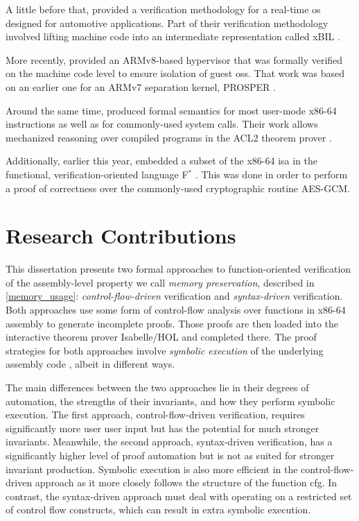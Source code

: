A little before that, \textcite{shi2012orientais} provided a verification methodology
for a real-time \ac{os} designed for automotive applications.
Part of their verification methodology involved lifting machine code into an intermediate
representation called xBIL \autocite{shi2012xbil}.

More recently, \textcite{baumann2016high} provided an ARMv8-based hypervisor
that was formally verified on the machine code level
to ensure isolation of guest \acp{os}.
That work was based on an earlier one for an ARMv7 separation kernel,
PROSPER \autocite{dam2013hypervisor,dam2013formal}.

Around the same time, \textcite{goel2014syscalls,goelphd} produced formal semantics
for most user-mode x86-64 instructions as well as for commonly-used system calls.
Their work allows mechanized reasoning over compiled programs
in the ACL2 theorem prover \autocite{ACL2}.

Additionally, earlier this year, \textcite{fromherz2019verified} embedded a subset
of the x86-64 \ac{isa} in the functional, verification-oriented language
F$^*$ \autocite{fstar}.
This was done in order to perform a proof of correctness
over the commonly-used cryptographic routine AES-GCM.

\section{Research Contributions}
This dissertation presents two formal approaches to function-oriented verification
of the assembly-level property we call \emph{memory preservation},
described in \cref{memory_usage}:
\emph{control-flow-driven} verification and \emph{syntax-driven} verification.
Both approaches use some form of control-flow analysis over functions in x86-64 assembly
to generate incomplete proofs.
Those proofs are then loaded into the interactive theorem prover Isabelle/HOL
and completed there. The proof strategies for both approaches involve
\emph{symbolic execution} of the underlying assembly code \autocite{king1976symbolic},
albeit in different ways.

The main differences between the two approaches
lie in their degrees of automation, the strengths of their invariants,
and how they perform symbolic execution.
The first approach, control-flow-driven verification,
requires significantly more user user input but has the potential for much stronger invariants.
Meanwhile, the second approach, syntax-driven verification,
has a significantly higher level of proof automation
but is not as suited for stronger invariant production.
Symbolic execution is also more efficient in the control-flow-driven approach
as it more closely follows the structure of the function \ac{cfg}.
In contrast, the syntax-driven approach must deal with
operating on a restricted set of control flow constructs,
which can result in extra symbolic execution.

